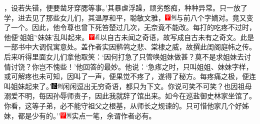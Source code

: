 {，设若失错，便要凿牙穿腮等事。'其暴虐浮躁，顽劣憨痴，种种异常。只一放了学，进去见了那些女儿们，其温厚和平，聪敏文雅，{\includegraphics[width=3mm]{../Images/00002}\includegraphics[width=3mm]{../Images/00011}\footnotesize \kaishu 与前八个字嫡对。}竟又变了一个。因此，他令尊也曾下死笞楚过几次，无奈竟不能改。每打的吃疼不过时，他便`姐姐'`妹妹'乱叫起来。{{{\includegraphics[width=3mm]{../Images/00002}\includegraphics[width=3mm]{../Images/00010}\footnotesize \kaishu 以自古未闻之奇语，故写成自古未有之奇文。此是一部书中大调侃寓意处。盖作者实因}鹡鸰{之悲、棠棣之威，故撰此闺阁庭帏之传。}}}后来听得里面女儿们拿他取笑：`因何打急了只管唤姐妹做甚？莫不是求姐妹去讨情讨饶？你岂不愧些！'他回答的最妙。他说：`急疼之时，只叫姐姐、妹妹字样，或可解疼也未可知，因叫了一声，便果觉不疼了，遂得了秘方。每疼痛之极，便连叫姐妹起来了。'{\includegraphics[width=3mm]{../Images/00006}\includegraphics[width=3mm]{../Images/00011}\footnotesize \kaishu 闲闲逗出无穷奇语，都只为下文。}你说可笑不可笑？也因祖母溺爱不明，每因孙辱师责子，因此我就辞了馆出来。如今在巡盐御史林家坐馆了。你看，这等子弟，必不能守祖父之根基，从师长之规谏的。只可惜他家几个好姊妹，都是少有的。''{\includegraphics[width=3mm]{../Images/00002}\includegraphics[width=3mm]{../Images/00011}\footnotesize \kaishu 实点一笔，余谓作者必有。}

}
